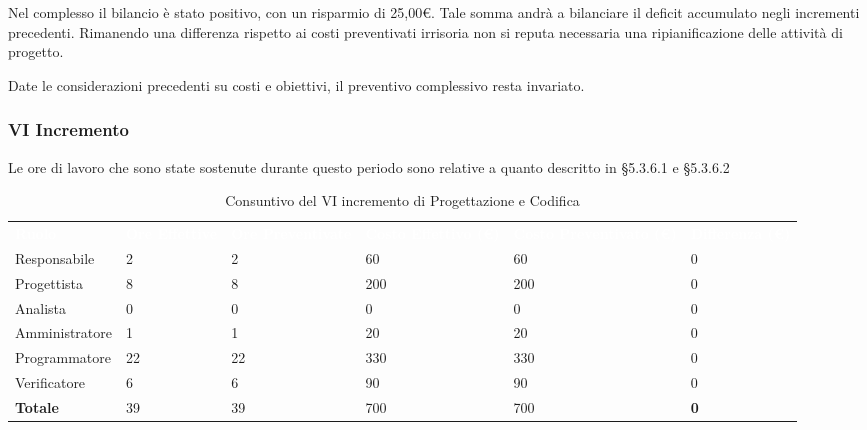 Nel complesso il bilancio è stato positivo, con un risparmio di 25,00\euro. Tale somma andrà a bilanciare il deficit accumulato negli incrementi precedenti. Rimanendo una differenza rispetto ai costi preventivati irrisoria non si reputa necessaria una ripianificazione delle attività di progetto.

Date le considerazioni precedenti su costi e obiettivi, il preventivo complessivo resta invariato.


\pagebreak


\subsubsection{VI Incremento}
Le ore di lavoro che sono state sostenute durante questo periodo sono relative a quanto descritto in §5.3.6.1 e §5.3.6.2

\begin{table}[H]
\begin{center}
\renewcommand{\arraystretch}{1.5}
\begin{tabular}{ m{}<{\centering}  m{}<{\centering} m{}<{\centering} m{}<{\centering} m{}<{\centering} m{}<{\centering}}	\rowcolor{darkblue}
	\textcolor{white}{\textbf{Ruolo}} & \textcolor{white}{\textbf{Ore Effettive}} & \textcolor{white}{\textbf{Ore Preventivate}}&\textcolor{white}{\textbf{Costo Effettivo (\euro)}}&\textcolor{white}{\textbf{Costo Preventivato (\euro)}}&\textcolor{white}{\textbf{Differenza (\euro)}}\\ 

	Responsabile  & 2 & 2 & 60 & 60 & 0\\	
	
	Progettista & 8 & 8 & 200 & 200 & 0\\
	
	Analista & 0 & 0 & 0 & 0 & 0\\
	
	Amministratore & 1 & 1 & 20 & 20 & 0\\
	
	Programmatore & 22 & 22 & 330 & 330 & 0\\
	
	Verificatore & 6 & 6 & 90 & 90 & 0\\
	
	\textbf{Totale} & 39 & 39 & 700 & 700 & \textbf{0} \\
	
\end{tabular}
\caption{Consuntivo del VI incremento di Progettazione e Codifica}
\end{center}
\end{table}

